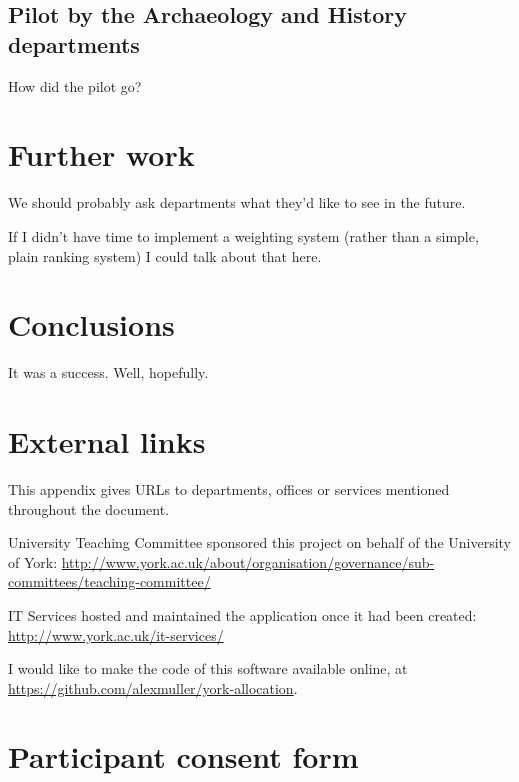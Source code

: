 \documentclass[]{scrartcl}
\begin{document}
\subsection{Pilot by the Archaeology and History departments}

How did the pilot go?

\section{Further work}


We should probably ask departments what they'd like to see in the future.

If I didn't have time to implement a weighting system (rather than a simple,
plain ranking system) I could talk about that here.

\section{Conclusions}


It was a success. Well, hopefully.

\appendix


\newpage
\section{External links}

This appendix gives URLs to departments, offices or services mentioned
throughout the document.

University Teaching Committee sponsored this project on behalf of the
University of York:
\url{http://www.york.ac.uk/about/organisation/governance/sub-committees/teaching-committee/}

IT Services hosted and maintained the application once it had been created:
\url{http://www.york.ac.uk/it-services/}

I would like to make the code of this software available online, at
\url{https://github.com/alexmuller/york-allocation}.

\newpage
\section{Participant consent form}
\label{sec:consent}
\end{document}
